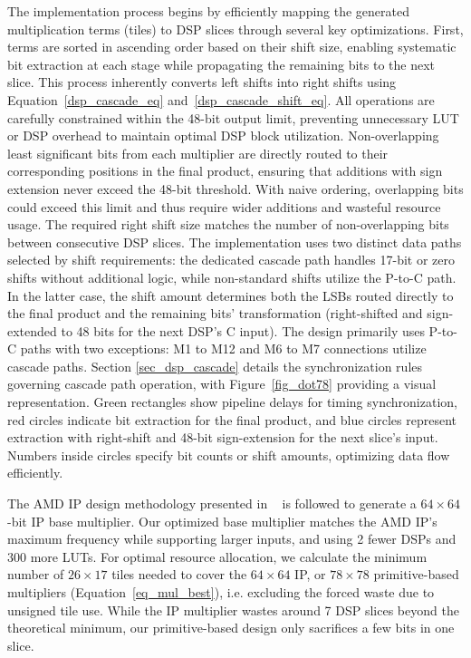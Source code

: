 \documentclass[conference]{IEEEtran}
\begin{document}
The implementation process begins by efficiently mapping the generated multiplication terms (tiles) to DSP slices through several key optimizations.
First, terms are sorted in ascending order based on their shift size, enabling systematic bit extraction at each stage while propagating the remaining bits to the next slice. 
This process inherently converts left shifts into right shifts using Equation~\ref{dsp_cascade_eq} and~\ref{dsp_cascade_shift_eq}.
All operations are carefully constrained within the 48-bit output limit, preventing unnecessary LUT or DSP overhead to maintain optimal DSP block utilization. 
Non-overlapping least significant bits from each multiplier are directly routed to their corresponding positions in the final product, ensuring that additions with sign extension never exceed the 48-bit threshold. 
With naive ordering, overlapping bits could exceed this limit and thus require wider additions and wasteful resource usage.
The required right shift size matches the number of non-overlapping bits between consecutive DSP slices.
The implementation uses two distinct data paths selected by shift requirements: the dedicated cascade path handles 17-bit or zero shifts without additional logic, while non-standard shifts utilize the P-to-C path. 
In the latter case, the shift amount determines both the LSBs routed directly to the final product and the remaining bits' transformation (right-shifted and sign-extended to 48 bits for the next DSP's C input).
The design primarily uses P-to-C paths with two exceptions: M1 to M12 and M6 to M7 connections utilize cascade paths. 
Section \ref{sec_dsp_cascade} details the synchronization rules governing cascade path operation, with Figure~\ref{fig_dot78} providing a visual representation.
Green rectangles show pipeline delays for timing synchronization, red circles indicate bit extraction for the final product, and blue circles represent extraction with right-shift and 48-bit sign-extension for the next slice's input. 
Numbers inside circles specify bit counts or shift amounts, optimizing data flow efficiently. 





The AMD IP design methodology presented in ~\cite{xilinxincIPMultiplier2015} is followed to generate a $64\times64$-bit IP base multiplier. 
Our optimized base multiplier matches the AMD IP's maximum frequency while supporting larger inputs, and using 2 fewer DSPs and 300 more LUTs. 
For optimal resource allocation, we calculate the minimum number of $26\times17$ tiles needed to cover the $64\times64$ IP, or $78\times78$ primitive-based multipliers (Equation~\ref{eq_mul_best}), i.e. excluding the forced waste due to unsigned tile use.
While the IP multiplier wastes around 7 DSP slices beyond the theoretical minimum, our primitive-based design only sacrifices a few bits in one slice.
\end{document}
